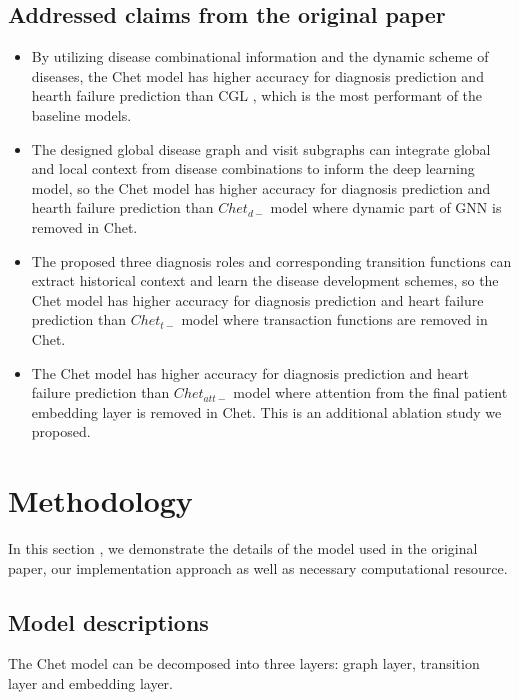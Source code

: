 \documentclass[11pt,a4paper,fleqn]{article}
\begin{document}
\subsection{Addressed claims from the original paper}
\begin{itemize}
    \item By utilizing disease combinational information and the dynamic scheme
    of diseases, the Chet model has higher accuracy for diagnosis prediction and
    hearth failure prediction than CGL \cite{cgl}, which is the most performant
    of the baseline models. 
    \item The designed global disease graph and visit subgraphs can integrate
    global and local context from disease combinations to inform the deep
    learning model, so the Chet model has higher accuracy for diagnosis
    prediction and hearth failure prediction than $Chet_{d-}$ model where
    dynamic part of GNN is removed in Chet.
    \item The proposed three diagnosis roles and corresponding transition
    functions can extract historical context and learn the disease development
    schemes, so the Chet model has higher accuracy for diagnosis prediction and
    heart failure prediction than $Chet_{t-}$ model where transaction functions
    are removed in Chet.
    \item The Chet model has higher accuracy for diagnosis prediction and heart
    failure prediction than $Chet_{att-}$ model where attention from the final
    patient embedding layer is removed in Chet. This is an additional ablation
    study we proposed.
\end{itemize}

\section{Methodology}
In this section , we demonstrate the details of the model used in the original
paper, our implementation approach as well as necessary computational resource.
\subsection{Model descriptions}
The Chet model can be decomposed into three layers: graph layer, transition
layer and embedding layer.
\end{document}

